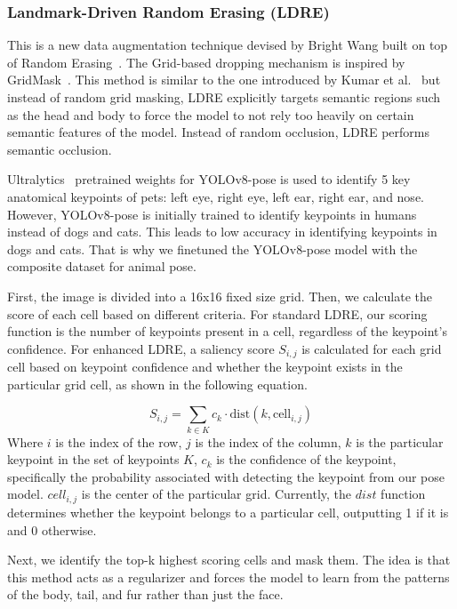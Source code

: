 \documentclass[10pt,twocolumn,letterpaper]{article}
\begin{document}
\subsubsection{Landmark-Driven Random Erasing (LDRE)}
This is a new data augmentation technique devised by Bright Wang built on top of Random Erasing~\cite{zhong2020random}. The Grid-based dropping mechanism is inspired by GridMask~\cite{chen2020gridmask}. This method is similar to the one introduced by Kumar et al.~\cite{kumar2017hide} but instead of random grid masking, LDRE explicitly targets semantic regions such as the head and body to force the model to not rely too heavily on certain semantic features of the model. Instead of random occlusion, LDRE performs semantic occlusion.

Ultralytics~\cite{yolov8_ultralytics} pretrained weights for YOLOv8-pose is used to identify 5 key anatomical keypoints of pets: left eye, right eye, left ear, right ear, and nose. However, YOLOv8-pose is initially trained to identify keypoints in humans instead of dogs and cats. This leads to low accuracy in identifying keypoints in dogs and cats. That is why we finetuned the YOLOv8-pose model with the composite dataset for animal pose.

First, the image is divided into a 16x16 fixed size grid. Then, we calculate the score of each cell based on different criteria. For standard LDRE, our scoring function is the number of keypoints present in a cell, regardless of the keypoint's confidence. For enhanced LDRE, a saliency score $S_{i,j}$ is calculated for each grid cell based on keypoint confidence and whether the keypoint exists in the particular grid cell, as shown in the following equation.

\begin{equation}
    S_{i,j} = \sum_{k \in K} c_k \cdot \text{dist}(k, \text{cell}_{i,j})
\end{equation}
Where $i$ is the index of the row, $j$ is the index of the column, $k$ is the particular keypoint in the set of keypoints $K$, $c_k$ is the confidence of the keypoint, specifically the probability associated with detecting the keypoint from our pose model. $cell_{i,j}$ is the center of the particular grid. Currently, the $dist$ function determines whether the keypoint belongs to a particular cell, outputting 1 if it is and 0 otherwise.

Next, we identify the top-k highest scoring cells and mask them. The idea is that this method acts as a regularizer and forces the model to learn from the patterns of the body, tail, and fur rather than just the face.
\end{document}
